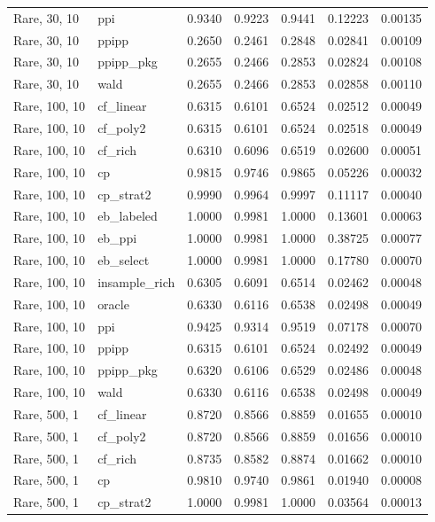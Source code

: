 \begin{longtable}{llrrrrr}
Rare, 30, 10 & ppi & 0.9340 & 0.9223 & 0.9441 & 0.12223 & 0.00135 \\
Rare, 30, 10 & ppipp & 0.2650 & 0.2461 & 0.2848 & 0.02841 & 0.00109 \\
Rare, 30, 10 & ppipp\_pkg & 0.2655 & 0.2466 & 0.2853 & 0.02824 & 0.00108 \\
Rare, 30, 10 & wald & 0.2655 & 0.2466 & 0.2853 & 0.02858 & 0.00110 \\
Rare, 100, 10 & cf\_linear & 0.6315 & 0.6101 & 0.6524 & 0.02512 & 0.00049 \\
Rare, 100, 10 & cf\_poly2 & 0.6315 & 0.6101 & 0.6524 & 0.02518 & 0.00049 \\
Rare, 100, 10 & cf\_rich & 0.6310 & 0.6096 & 0.6519 & 0.02600 & 0.00051 \\
Rare, 100, 10 & cp & 0.9815 & 0.9746 & 0.9865 & 0.05226 & 0.00032 \\
Rare, 100, 10 & cp\_strat2 & 0.9990 & 0.9964 & 0.9997 & 0.11117 & 0.00040 \\
Rare, 100, 10 & eb\_labeled & 1.0000 & 0.9981 & 1.0000 & 0.13601 & 0.00063 \\
Rare, 100, 10 & eb\_ppi & 1.0000 & 0.9981 & 1.0000 & 0.38725 & 0.00077 \\
Rare, 100, 10 & eb\_select & 1.0000 & 0.9981 & 1.0000 & 0.17780 & 0.00070 \\
Rare, 100, 10 & insample\_rich & 0.6305 & 0.6091 & 0.6514 & 0.02462 & 0.00048 \\
Rare, 100, 10 & oracle & 0.6330 & 0.6116 & 0.6538 & 0.02498 & 0.00049 \\
Rare, 100, 10 & ppi & 0.9425 & 0.9314 & 0.9519 & 0.07178 & 0.00070 \\
Rare, 100, 10 & ppipp & 0.6315 & 0.6101 & 0.6524 & 0.02492 & 0.00049 \\
Rare, 100, 10 & ppipp\_pkg & 0.6320 & 0.6106 & 0.6529 & 0.02486 & 0.00048 \\
Rare, 100, 10 & wald & 0.6330 & 0.6116 & 0.6538 & 0.02498 & 0.00049 \\
Rare, 500, 1 & cf\_linear & 0.8720 & 0.8566 & 0.8859 & 0.01655 & 0.00010 \\
Rare, 500, 1 & cf\_poly2 & 0.8720 & 0.8566 & 0.8859 & 0.01656 & 0.00010 \\
Rare, 500, 1 & cf\_rich & 0.8735 & 0.8582 & 0.8874 & 0.01662 & 0.00010 \\
Rare, 500, 1 & cp & 0.9810 & 0.9740 & 0.9861 & 0.01940 & 0.00008 \\
Rare, 500, 1 & cp\_strat2 & 1.0000 & 0.9981 & 1.0000 & 0.03564 & 0.00013 \\

\end{longtable}
